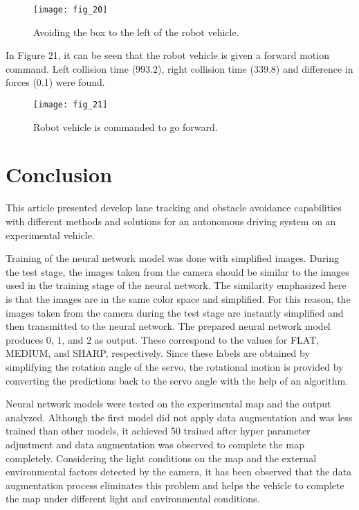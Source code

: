 \documentclass[twocolumn, switch]{article} %
\begin{document}
\begin{figure}[h]
    \centering
    \texttt{[image: fig\_20]}
    \caption{Avoiding the box to the left of the robot vehicle.}
    \label{fig:fig20}
\end{figure}

In Figure 21, it can be seen that the robot vehicle is given a
forward motion command. Left collision time (993.2), right
collision time (339.8) and difference in forces (0.1) were
found.

\begin{figure}[h]
    \centering
    \texttt{[image: fig\_21]}
    \caption{Robot vehicle is commanded to go forward.}
    \label{fig:fig21}
\end{figure}

\section{Conclusion}

This article presented develop lane tracking and obstacle
avoidance capabilities with different methods and solutions
for an autonomous driving system on an experimental
vehicle.

Training of the neural network model was done with
simplified images. During the test stage, the images taken
from the camera should be similar to the images used in the
training stage of the neural network. The similarity
emphasized here is that the images are in the same color
space and simplified. For this reason, the images taken from
the camera during the test stage are instantly simplified and
then transmitted to the neural network. The prepared neural
network model produces 0, 1, and 2 as output. These
correspond to the values for FLAT, MEDIUM, and SHARP,
respectively. Since these labels are obtained by simplifying
the rotation angle of the servo, the rotational motion is
provided by converting the predictions back to the servo
angle with the help of an algorithm.

Neural network models were tested on the experimental map
and the output analyzed. Although the first model did not
apply data augmentation and was less trained than other
models, it achieved 50%
trained after hyper parameter adjustment and data
augmentation was observed to complete the map completely.
Considering the light conditions on the map and the external
environmental factors detected by the camera, it has been
observed that the data augmentation process eliminates this
problem and helps the vehicle to complete the map under
different light and environmental conditions.
\end{document}
